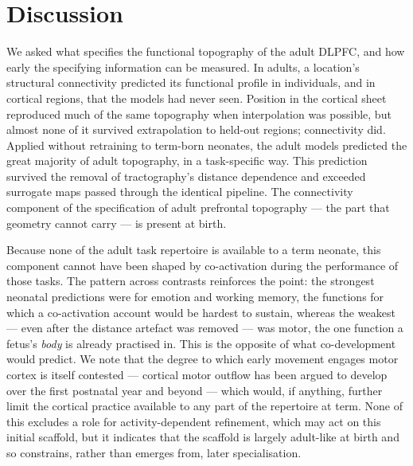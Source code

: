 \documentclass[11pt]{article}
\begin{document}
\section{Discussion}

We asked what specifies the functional topography of the adult DLPFC, and
how early the specifying information can be measured. In adults, a
location's structural connectivity predicted its functional profile in
individuals, and in cortical regions, that the models had never seen.
Position in the cortical sheet reproduced much of the same topography when
interpolation was possible, but almost none of it survived extrapolation to
held-out regions; connectivity did. Applied without retraining to 
term-born neonates, the adult models predicted the great majority of adult topography, in a task-specific way. This prediction
survived the removal of tractography's distance dependence and exceeded
surrogate maps passed through the identical pipeline. The connectivity
component of the specification of adult prefrontal topography --- the part
that geometry cannot carry --- is present at birth.

Because none of the adult task repertoire is available to a term neonate,
this component cannot have been shaped by co-activation during the
performance of those tasks. The pattern across contrasts reinforces the
point: the strongest neonatal predictions were for emotion and working
memory, the functions for which a co-activation account would be hardest to
sustain, whereas the weakest --- even after the distance artefact was
removed --- was motor, the one function a fetus's \emph{body} is already
practised in. This is the opposite of what co-development would predict. We
note that the degree to which early movement engages motor cortex is itself
contested --- cortical motor outflow has been argued to develop over the
first postnatal year and beyond \citep{blumberg2023} --- which would, if
anything, further limit the cortical practice available to any part of the
repertoire at term. None of this excludes a role for activity-dependent
refinement, which may act on this initial scaffold, but it indicates that
the scaffold is largely adult-like at birth and so constrains, rather than
emerges from, later specialisation.
\end{document}
